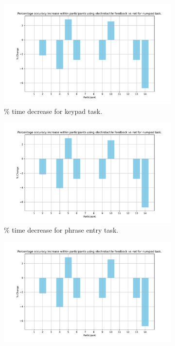 \documentclass{mpaper}
\begin{document}
\begin{figure}
    \centering
    \begin{subfigure}{0.45\textwidth}
        \includegraphics[width=\textwidth, page=3]{images/combinepdf.pdf}
        \caption{\% time decrease for keypad task.}
        \label{subfig:time-numpad}
    \end{subfigure} \hfill
    \begin{subfigure}{0.45\textwidth}
        \includegraphics[width=\textwidth, page=4]{images/combinepdf.pdf}
        \caption{\% time decrease for phrase entry task.}
    \end{subfigure} \hfill
    \begin{subfigure}{0.45\textwidth}
        \includegraphics[width=\textwidth, page=1]{images/combinepdf.pdf}

\end{subfigure}
\end{figure}
\end{document}
